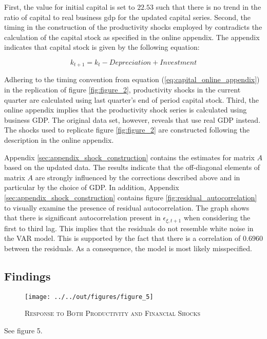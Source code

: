 First, the value for initial capital is set to $22.53$ such that there is no trend in the ratio of capital to real business gdp for the updated capital series. Second, the timing in the construction of the productivity shocks employed by \citeauthor{JERMANNfinancial} contradicts the calculation of the capital stock as specified in the online appendix. The appendix indicates that capital stock is given by the following equation:

\begin{equation} 
\label{eq:capital_online_appendix}
k_{t+1} = k_{t} - Depreciation + Investment
\end{equation} 

Adhering to the timing convention from equation (\ref{eq:capital_online_appendix}) in the replication of figure \ref{fig:figure_2}, productivity shocks in the current quarter are calculated using last quarter's end of period capital stock. 
Third, the online appendix implies that the productivity shock series is calculated using business GDP. The original data set, however, reveals that \citeauthor{JERMANNfinancial} use real GDP instead. The shocks used to replicate figure \ref{fig:figure_2} are constructed following the description in the online appendix. 

Appendix \ref{sec:appendix_shock_construction} contains the estimates for matrix $A$ based on the updated data. The results indicate that the off-diagonal elements of matrix $A$ are strongly influenced by the corrections described above and in particular by the choice of GDP. 
In addition, Appendix \ref{sec:appendix_shock_construction} contains figure \ref{fig:residual_autocorrelation} to visually examine the presence of residual autocorrelation.
The graph shows that there is significant autocorrelation present in ${\epsilon}_{\xi,t+1}$ when considering the first to third lag. This implies that the residuals do not resemble white noise in the VAR model. This is supported by the fact that there is a correlation of $0.6960$ between the residuals. As a consequence, the model is most likely misspecified.


\subsection{Findings}
\label{sec:findings}

\begin{figure}[t]
    
    \centering

    \texttt{[image: ../../out/figures/figure\_5]}

    \caption{\textsc{Response to Both Productivity and Financial Shocks}}
    
    \label{fig:figure_5}

\end{figure}

See figure 5.